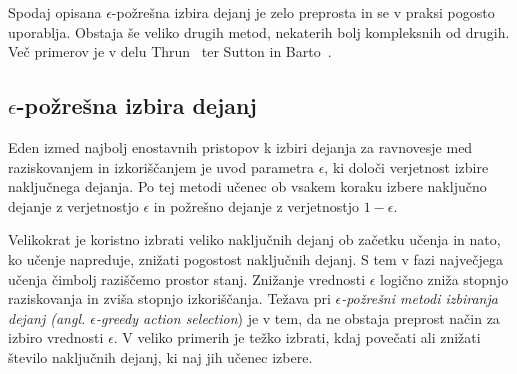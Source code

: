 \documentclass[a4paper, oneside, 12pt]{report}
\begin{document}
Spodaj opisana $\epsilon$-požrešna izbira dejanj je zelo preprosta in se v praksi pogosto uporablja. Obstaja še veliko drugih metod, nekaterih bolj kompleksnih od drugih. Več primerov je v delu Thrun~\cite{TheRoleOfExplorationInLearningControl} ter Sutton in Barto~\cite{ReinforcementLearningAnIntroduction}.

\subsection{$\epsilon$-požrešna izbira dejanj}
Eden izmed najbolj enostavnih pristopov k izbiri dejanja za ravnovesje med raziskovanjem in izkoriščanjem je uvod parametra $\epsilon$, ki določi verjetnost izbire naključnega dejanja. Po tej metodi učenec ob vsakem koraku izbere naključno dejanje z verjetnostjo $\epsilon$ in požrešno dejanje z verjetnostjo $1 - \epsilon$.

Velikokrat je koristno izbrati veliko naključnih dejanj ob začetku učenja in nato, ko učenje napreduje, znižati pogostost naključnih dejanj. S tem v fazi največjega učenja čimbolj raziščemo prostor stanj. Znižanje vrednosti $\epsilon$ logično zniža stopnjo raziskovanja in zviša stopnjo izkoriščanja. Težava pri {\em $\epsilon$-požrešni metodi izbiranja dejanj (angl. $\epsilon$-greedy action selection}) je v tem, da ne obstaja preprost način za izbiro vrednosti $\epsilon$. V veliko primerih je težko izbrati, kdaj povečati ali znižati število naključnih dejanj, ki naj jih učenec izbere.




\end{document}
